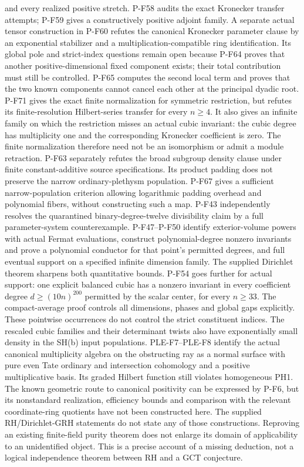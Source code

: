 and every realized positive stretch.  P-F58 audits the exact
Kronecker transfer attempts; P-F59 gives a constructively positive
adjoint family.  A separate actual tensor construction in P-F60
refutes the canonical Kronecker parameter clause by an exponential
stabilizer and a multiplication-compatible ring identification.
Its global pole and strict-index questions remain open because
P-F64 proves that another positive-dimensional fixed component exists;
their total contribution must still be controlled. P-F65 computes
the second local term and proves that the two known components
cannot cancel each other at the principal dyadic root.
P-F71 gives the exact finite normalization for symmetric
restriction, but refutes its finite-resolution Hilbert-series
transfer for every $n\ge4$.
It also gives an infinite family on which the restriction
misses an actual cubic invariant: the cubic degree has
multiplicity one and the corresponding Kronecker coefficient
is zero.  The finite normalization therefore need not be
an isomorphism or admit a module retraction.
P-F63 separately
refutes the broad subgroup density clause under finite
constant-additive source specifications. Its product padding does
not preserve the narrow ordinary-plethysm population.
P-F67 gives a sufficient narrow-population criterion allowing
logarithmic padding overhead and polynomial fibers, without
constructing such a map.
P-F43 independently resolves the quarantined binary-degree-twelve
divisibility claim by a full parameter-system counterexample.
P-F47--P-F50 identify exterior-volume powers with actual Fermat
evaluations, construct polynomial-degree nonzero invariants and
prove a polynomial conductor for that point's permitted degrees,
and full eventual support on a specified infinite dimension family.
The supplied Dirichlet theorem sharpens both quantitative bounds.
P-F54 goes further for actual support: one explicit balanced
cubic has a nonzero invariant in every coefficient degree
$d\ge(10n)^{200}$ permitted by the scalar center, for every
$n\ge33$. The compact-average proof controls all dimensions,
phases and global gaps explicitly.
These pointwise occurrences do not control the strict constituent
indices. The rescaled cubic families and their determinant twists
also have exponentially small density in the SH(b) input populations.
PLE-F7--PLE-F8 identify the actual canonical multiplicity algebra on
the obstructing ray as a normal surface with pure even Tate ordinary
and intersection cohomology and a positive multiplicative basis.
Its graded Hilbert function still violates homogeneous PH1.
The known geometric route to
canonical positivity can be expressed by P-F6, but its nonstandard
realization, efficiency bounds and comparison with the relevant
coordinate-ring quotients have not been constructed here.
The supplied RH/Dirichlet-GRH statements do not state any of those
constructions. Reproving an existing finite-field purity theorem does
not enlarge its domain of applicability to an unidentified object.
This is a precise account of a missing deduction, not a logical
independence theorem between RH and a GCT conjecture.
